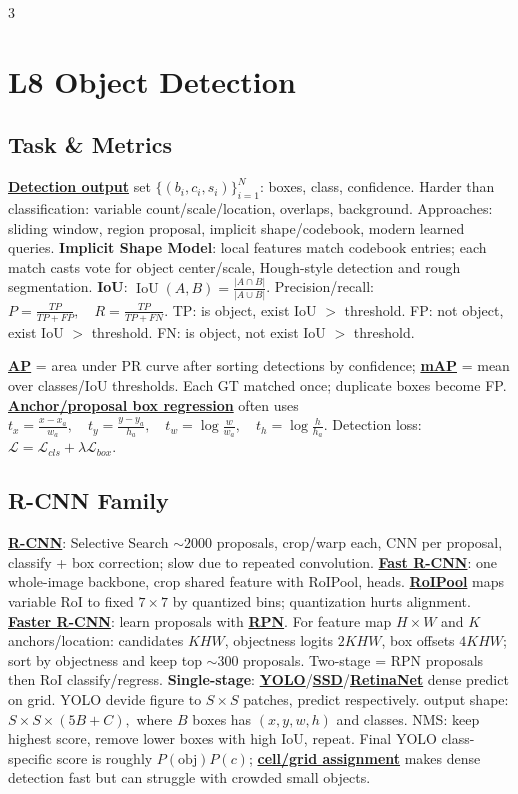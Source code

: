 \documentclass{article}
\numberwithin{equation}{subsection}
\newcommand{\key}[1]{\textbf{#1}}
\newcommand{\lowterm}[1]{\textbf{\underline{#1}}}
\DeclareMathOperator{\IoU}{IoU}
\begin{document}
\begin{multicols*}{3}
\section{L8 Object Detection}
\subsection{Task \& Metrics}
\lowterm{Detection output} set $\{(b_i,c_i,s_i)\}_{i=1}^N$: boxes, class, confidence. Harder than classification: variable count/scale/location, overlaps, background. Approaches: sliding window, region proposal, implicit shape/codebook, modern learned queries. \key{Implicit Shape Model}: local features match codebook entries; each match casts vote for object center/scale, Hough-style detection and rough segmentation.
\key{IoU}: $\IoU(A,B)=\frac{|A\cap B|}{|A\cup B|}$. Precision/recall:
\(
P=\frac{TP}{TP+FP},\quad R=\frac{TP}{TP+FN}.
\) TP: is object, exist IoU $>$ threshold. FP: not object, exist IoU $>$ threshold. FN: is object, not exist IoU $>$ threshold. 

\lowterm{AP} = area under PR curve after sorting detections by confidence; \lowterm{mAP} = mean over classes/IoU thresholds. Each GT matched once; duplicate boxes become FP. \lowterm{Anchor/proposal box regression} often uses
\(
t_x=\frac{x-x_a}{w_a},\quad t_y=\frac{y-y_a}{h_a},\quad t_w=\log\frac{w}{w_a},\quad t_h=\log\frac{h}{h_a}.
\)
Detection loss:
\(
\mathcal L=\mathcal L_{cls}+\lambda\mathcal L_{box}.
\)

\subsection{R-CNN Family}
\lowterm{R-CNN}: Selective Search $\sim2000$ proposals, crop/warp each, CNN per proposal, classify + box correction; slow due to repeated convolution. \lowterm{Fast R-CNN}: one whole-image backbone, crop shared feature with RoIPool, heads. \lowterm{RoIPool} maps variable RoI to fixed $7\times7$ by quantized bins; quantization hurts alignment. \lowterm{Faster R-CNN}: learn proposals with \lowterm{RPN}. For feature map $H\times W$ and $K$ anchors/location: candidates $KHW$, objectness logits $2KHW$, box offsets $4KHW$; sort by objectness and keep top $\sim300$ proposals. Two-stage = RPN proposals then RoI classify/regress.
\key{Single-stage}: \lowterm{YOLO}/\lowterm{SSD}/\lowterm{RetinaNet} dense predict on grid. YOLO devide figure to $S\times S$ patches, predict respectively. output shape:
\(
S\times S\times(5B+C),
\)
where $B$ boxes has $(x,y,w,h)$ and classes. NMS: keep highest score, remove lower boxes with high IoU, repeat.
Final YOLO class-specific score is roughly $P(\mathrm{obj})P(c)$; \lowterm{cell/grid assignment} makes dense detection fast but can struggle with crowded small objects.


\end{multicols*}
\end{document}
